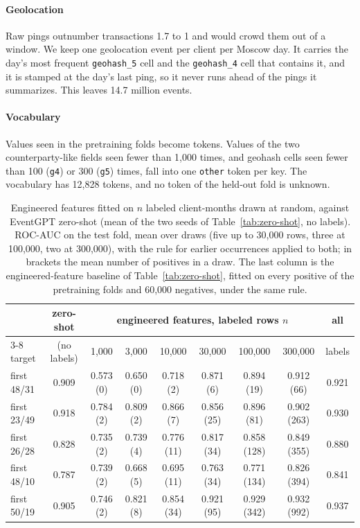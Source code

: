 \documentclass[12pt]{article}
\newcommand{\tok}[1]{\texttt{#1}}
\begin{document}
\paragraph{Geolocation} Raw pings outnumber transactions 1.7 to 1 and would crowd them out of a window. We keep one geolocation event per client per Moscow day. It carries the day's most frequent \tok{geohash\_5} cell and the \tok{geohash\_4} cell that contains it, and it is stamped at the day's last ping, so it never runs ahead of the pings it summarizes. This leaves 14.7 million events.

\paragraph{Vocabulary} Values seen in the pretraining folds become tokens. Values of the two counterparty-like fields seen fewer than 1,000 times, and geohash cells seen fewer than 100 (\tok{g4}) or 300 (\tok{g5}) times, fall into one \tok{other} token per key. The vocabulary has 12,828 tokens, and no token of the held-out fold is unknown.

\begin{table}[htbp]
\centering
\caption{Engineered features fitted on $n$ labeled client-months drawn at random, against EventGPT zero-shot (mean of the two seeds of Table~\ref{tab:zero-shot}, no labels). ROC-AUC on the test fold, mean over draws (five up to 30,000 rows, three at 100,000, two at 300,000), with the rule for earlier occurrences applied to both; in brackets the mean number of positives in a draw. The last column is the engineered-feature baseline of Table~\ref{tab:zero-shot}, fitted on every positive of the pretraining folds and 60,000 negatives, under the same rule.}
\label{tab:labels}
\footnotesize
\setlength{\tabcolsep}{3pt}
\begin{tabular}{lcccccccc}
\toprule
 & zero-shot & \multicolumn{6}{c}{engineered features, labeled rows $n$} & all \\
\cmidrule(lr){3-8}
target & (no labels) & 1,000 & 3,000 & 10,000 & 30,000 & 100,000 & 300,000 & labels \\
\midrule
first 48/31 & 0.909 & 0.573 (0) & 0.650 (0) & 0.718 (2) & 0.871 (6) & 0.894 (19) & 0.912 (66) & 0.921 \\
first 23/49 & 0.918 & 0.784 (2) & 0.809 (2) & 0.866 (7) & 0.856 (25) & 0.896 (81) & 0.902 (263) & 0.930 \\
first 26/28 & 0.828 & 0.735 (2) & 0.739 (4) & 0.776 (11) & 0.817 (34) & 0.858 (128) & 0.849 (355) & 0.880 \\
first 48/10 & 0.787 & 0.739 (2) & 0.668 (5) & 0.695 (11) & 0.763 (34) & 0.771 (134) & 0.826 (394) & 0.841 \\
first 50/19 & 0.905 & 0.746 (2) & 0.821 (8) & 0.854 (34) & 0.921 (95) & 0.929 (342) & 0.932 (992) & 0.937 \\
\bottomrule
\end{tabular}
\end{table}
\end{document}
